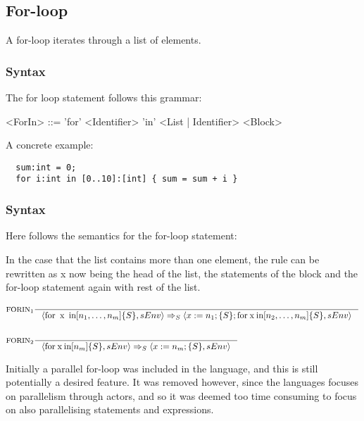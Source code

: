 \subsection{For-loop}
\label{subsec:forLoopStatements}

A for-loop iterates through a list of elements.

\subsubsection{Syntax}

The for loop statement follows this grammar:

\begin{grammar}
<ForIn> ::= 'for' <Identifier> 'in' <List | Identifier> <Block>
\end{grammar}

A concrete example:

\begin{verbatim}
  sum:int = 0;
  for i:int in [0..10]:[int] { sum = sum + i }
\end{verbatim}


\subsubsection{Syntax}

Here follows the semantics for the for-loop statement:

In the case that the list contains more than one element, the rule can be rewritten as x now being the head of the list, the statements of the block and the for-loop statement again with rest of the list.

\begin{align*}
&\inference[$\text{FORIN}_{1}$]{}
                       {\Braket{\Tfor \Tx \Tin [n_1,\dots,n_m]\{S\},sEnv} \Rightarrow_S \Braket{x := n_1;\{S\}; \Tfor \mathbin{\text{x}} \mathbin{\text{in}} [n_2,\dots,n_m]\{S\},sEnv}}
\\\\
&\inference[$\text{FORIN}_{2}$]{}
                       {\Braket{\Tfor \mathbin{\text{x}}\mathbin{\text{in}} [n_m]\{S\},sEnv} \Rightarrow_S \Braket{x := n_m;\{S\},sEnv}}
\end{align*}

Initially a parallel for-loop was included in the language, and this is still potentially a desired feature. It was removed however, since the languages focuses on parallelism through actors, and so it was deemed too time consuming to focus on also parallelising statements and expressions.

